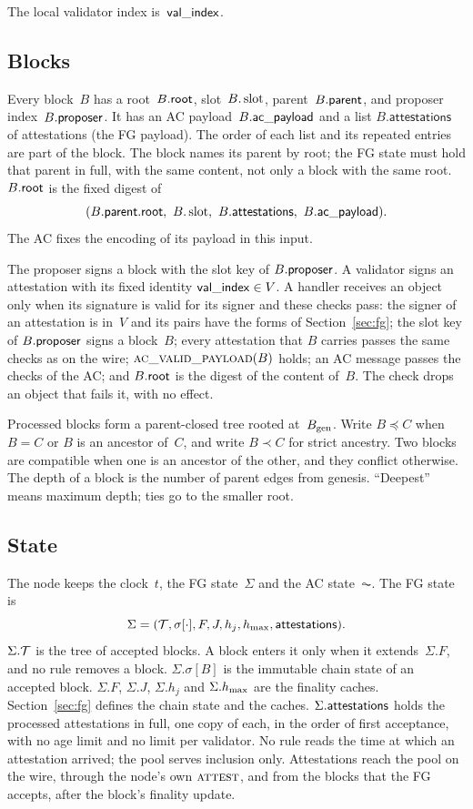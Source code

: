 The local validator index is~$\mathsf{val\_index}$.

\subsection{Blocks}\label{sec:blocks}

Every block~$B$ has a root~$B.\mathsf{root}$, slot~$B.\operatorname{slot}$, parent~$B.\mathsf{parent}$,
and proposer index~$B.\mathsf{proposer}$.  It has an AC payload~$B.\mathsf{ac\_payload}$ and a list
$B.\mathsf{attestations}$ of attestations (the FG payload).  The
order of each list and its repeated entries are part of the block.  The
block names its parent by root; the FG state must hold that parent in full,
with the same content, not only a block with the same root.  $B.\mathsf{root}$
is the fixed digest of
\[
 (B.\parent.\rootf,\ B.\slot,\ B.\mathsf{attestations},\ B.\acp).
\]
The AC fixes the encoding of its payload in this input.

The proposer signs a block with the slot key of $B.\mathsf{proposer}$.  A
validator signs an attestation with its fixed identity $\mathsf{val\_index}\in V$.
A handler receives an object only when its signature is valid for its
signer and these checks pass: the signer of an attestation is in~$V$ and
its pairs have the forms of Section~\ref{sec:fg}; the slot key of
$B.\mathsf{proposer}$ signs a block~$B$; every attestation
that $B$ carries passes the same checks as on the wire;
$\Call{ac\_valid\_payload}{B}$ holds; an AC message passes the checks of
the AC; and $B.\mathsf{root}$ is the digest of the content of~$B$.  The check
drops an object that fails it, with no effect.

Processed blocks form a parent-closed tree rooted at~$B_{\mathrm{gen}}$.  Write
$B\preceq C$ when $B=C$ or $B$ is an ancestor of~$C$, and write $B\prec C$
for strict ancestry.  Two blocks are compatible when one is an ancestor of
the other, and they conflict otherwise.  The depth of a block is the
number of parent edges from genesis.  ``Deepest'' means maximum depth;
ties go to the smaller root.

\subsection{State}\label{sec:store}

The node keeps the clock~$t$, the FG state~$\Sigma$ and the AC
state~$\AC$.  The FG state is
\[
 \Sigma=(\mathcal T,\sigma[\cdot],F,J,h_j,h_{\max},\mathsf{attestations}).
\]
$\Sigma.\mathcal T$ is the tree of accepted blocks.  A block enters it only when
it extends~$\Sigma.F$, and no rule removes a block.
$\Sigma.\sigma[B]$ is the immutable chain state of an accepted
block.  $\Sigma.F$, $\Sigma.J$, $\Sigma.h_j$ and $\Sigma.h_{\max}$ are the
finality caches.  Section~\ref{sec:fg} defines the chain state and the
caches.  $\Sigma.\mathsf{attestations}$ holds
the processed attestations in full, one copy of each, in the order of
first acceptance, with no age limit and no limit per validator.  No rule
reads the time at which an attestation arrived; the pool serves inclusion
only.  Attestations reach the pool on the wire, through the node's own
$\Call{attest}{}$, and from the blocks that the FG accepts, after the
block's finality update.

